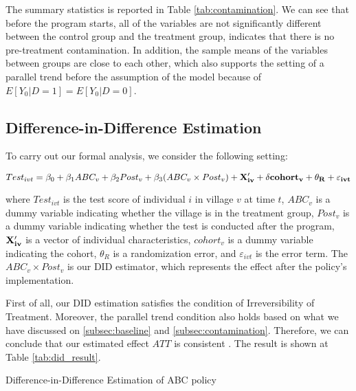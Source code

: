 \documentclass[12pt]{jfm}
\begin{document}
The summary statistics is reported in Table \ref{tab:contamination}. We can see that before the program starts, all of the variables are not significantly different between the control group and the treatment group, indicates that there is no pre-treatment contamination. In addition, the sample means of the variables between groups are close to each other, which also supports the setting of a parallel trend before the assumption of the model because of $E[Y_0\big|D = 1] = E[Y_0\big|D = 0]$.

\subsection{Difference-in-Difference Estimation} \label{subsec:did}

To carry out our formal analysis, we consider the following setting:

\begin{equation}
 Test_{ivt} = \beta_0 + \beta_1 ABC_{v} + \beta_2 Post_{v} + \beta_3 (ABC_v \times Post_v) + \bf{X}_{iv}^\prime + \delta cohort_{v} + \theta_R + \varepsilon_{ivt} \label{eq:did_baseline}  
\end{equation}

where $Test_{ivt}$ is the test score of individual $i$ in village $v$ at time $t$, $ABC_v$ is a dummy variable indicating whether the village is in the treatment group, $Post_v$ is a dummy variable indicating whether the test is conducted after the program, $\bf{X}_{iv}^\prime$ is a vector of individual characteristics, $cohort_{v}$ is a dummy variable indicating the cohort, $\theta_R$ is a randomization error, and $\varepsilon_{ivt}$ is the error term. The $ABC_v \times Post_v$ is our DID estimator, which represents the effect after the policy's implementation.

First of all, our DID estimation satisfies the condition of Irreversibility of Treatment. Moreover, the parallel trend condition also holds based on what we have discussed on \ref{subsec:baseline} and \ref{subsec:contamination}. Therefore, we can conclude that our estimated effect $ATT$ is consistent \citep{CALLAWAY2021200}. The result is shown at Table \ref{tab:did_result}.

\begin{table}
  \begin{center}
    \begin{footnotesize}
    \caption{Difference-in-Difference Estimation of ABC policy}
    \label{tab:did_result}
    
    \end{footnotesize}
  \end{center}
\end{table}
\end{document}

